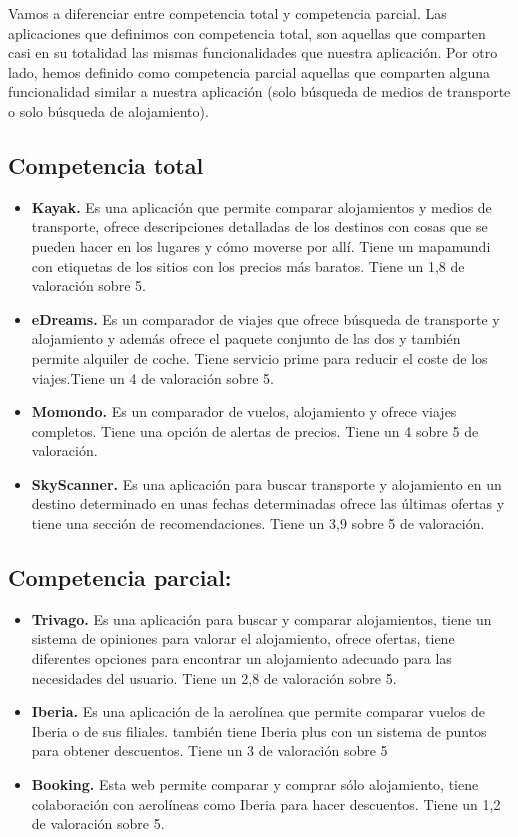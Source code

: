 Vamos a diferenciar entre competencia total y competencia parcial. Las aplicaciones que definimos con competencia total, son aquellas que comparten casi en su totalidad las mismas funcionalidades que nuestra aplicación. Por otro lado, hemos definido como competencia parcial aquellas que comparten alguna funcionalidad similar a nuestra aplicación (solo búsqueda de medios de transporte o solo búsqueda de alojamiento).

\subsection{Competencia total}
\begin{itemize}
    \item\textbf{Kayak.} Es una aplicación que permite comparar alojamientos y medios de transporte, ofrece descripciones detalladas de los destinos con cosas que se pueden hacer en los lugares y cómo moverse por allí. Tiene un mapamundi con etiquetas de los sitios con los precios más baratos. Tiene un 1,8 de valoración sobre 5.
    \item\textbf{eDreams.} Es un comparador de viajes que ofrece búsqueda de transporte y alojamiento y además ofrece el paquete conjunto de las dos y también permite alquiler de coche. Tiene servicio prime para reducir el coste de los viajes.Tiene un 4 de valoración sobre 5.
    \item\textbf{Momondo.} Es un comparador de vuelos, alojamiento y ofrece viajes completos. Tiene una opción de alertas de precios. Tiene un 4 sobre 5 de valoración.
    \item\textbf{SkyScanner.} Es una aplicación para buscar transporte y alojamiento en un destino determinado en unas fechas determinadas ofrece las últimas ofertas y tiene una sección de recomendaciones. Tiene un 3,9 sobre 5 de valoración.
\end{itemize}

\subsection{Competencia parcial:}
\begin{itemize}
    \item\textbf{Trivago.} Es una aplicación para buscar y comparar alojamientos, tiene un sistema de opiniones para valorar el alojamiento, ofrece ofertas, tiene diferentes opciones para encontrar un alojamiento adecuado para las necesidades del usuario. Tiene un 2,8 de valoración sobre 5.
    \item\textbf{Iberia.} Es una aplicación de la aerolínea que permite comparar vuelos de Iberia o de sus filiales. también tiene Iberia plus con un sistema de puntos para obtener descuentos. Tiene un 3 de valoración sobre 5
    \item\textbf{Booking.} Esta web permite comparar y comprar sólo alojamiento, tiene colaboración con aerolíneas como Iberia para hacer descuentos. Tiene un 1,2 de valoración sobre 5.
\end{itemize}

